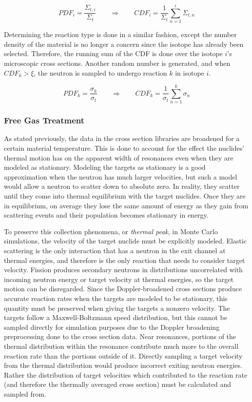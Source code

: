 \begin{equation}
\label{isotope_selection}
PDF_i = \frac{\Sigma_{t,i}}{\Sigma_t} \qquad \Rightarrow \qquad CDF_i = \frac{1}{\Sigma_t } \sum_{n=1}^i \Sigma_{t,n}
\end{equation}

Determining the reaction type is done in a similar fashion, except the number density of the material is no longer a concern since the isotope has already been selected.  Therefore, the running sum of the CDF is done over the isotope $i$'s microscopic cross sections.  Another random number is generated, and when $CDF_k > \xi$, the neutron is sampled to undergo reaction $k$ in isotope $i$.

\begin{equation}
\label{reaction_selection}
PDF_k = \frac{\sigma_k}{\sigma_t} \qquad \Rightarrow \qquad CDF_k = \frac{1}{\sigma_{t} } \sum_{n=1}^k \sigma_{n}
\end{equation}

\subsubsection{Free Gas Treatment}

As stated previously, the data in the cross section libraries are broadened for a certain material temperature.  This is done to account for the effect the nuclides' thermal motion has on the apparent width of resonances even when they are modeled as stationary.  Modeling the targets as stationary is a good approximation when the neutron has much larger velocities, but such a model would allow a neutron to scatter down to absolute zero.  In reality, they scatter until they come into thermal equilibrium with the target nuclides.  Once they are in equilibrium, on average they lose the same amount of energy as they gain from scattering events and their population becomes stationary in energy.  

To preserve this collection phenomena, or \emph{thermal peak}, in Monte Carlo simulations, the velocity of the target nuclide must be explicitly modeled.  Elastic scattering is the only interaction that has a neutron in the exit channel at thermal energies, and therefore is the only reaction that needs to consider target velocity.  Fission produces secondary neutrons in distributions uncorrelated with incoming neutron energy or target velocity at thermal energies, so the target motion can be disregarded.  Since the Doppler-broadened cross sections produce accurate reaction rates when the targets are modeled to be stationary, this quantity must be preserved when giving the targets a nonzero velocity.  The targets follow a Maxwell-Boltzmann speed distribution, but this cannot be sampled directly for simulation purposes due to the Doppler broadening preprocessing done to the cross section data.  Near resonances, portions of the thermal distribution within the resonance contribute much more to the overall reaction rate than the portions outside of it.  Directly sampling a target velocity from the thermal distribution would produce incorrect exiting neutron energies.  Rather the distribution of target velocities which contributed to the reaction rate (and therefore the thermally averaged cross section) must be calculated and sampled from.

